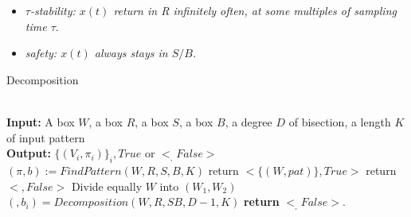     \begin{itemize}
        \item \emph{ ${\tau}$-stability: ${x(t)}$ return in R 
        infinitely often, at some multiples of sampling time ${\tau}$}.
        \item \emph{ safety: ${x(t)}$ always stays in ${S/B}$.}
    \end{itemize}

    \begin{algorithm}    
        \caption{Decomposition}\label{decomposition}    
        \begin{algorithmic}[1]
           \\
            \textbf{Input:} A box $W$, a box $R$, 
            a box $S$, a box $B$, a degree $D$ of bisection, a length $K$ of input pattern\\
            \textbf{Output:} $ \lbrace(V_i,\pi_i)\rbrace_i, True $ or $ <_,False>$ \\          
            $(\pi,b) := FindPattern(W,R,S,B,K)$
              \State return $<\lbrace (W,pat) \rbrace,True>$
            \Else
                \State return $<,False>$
              \Else
                \State Divide equally $W$ into $(W_1,W_2)$
                  \State $(,b_i) = Decomposition(W,R,SB,D-1,K)$
                \EndFor
              \EndIf
            \EndIf
            \State \textbf{return} $<_,False>$.
          \EndProcedure    
        \end{algorithmic}
      \end{algorithm}


